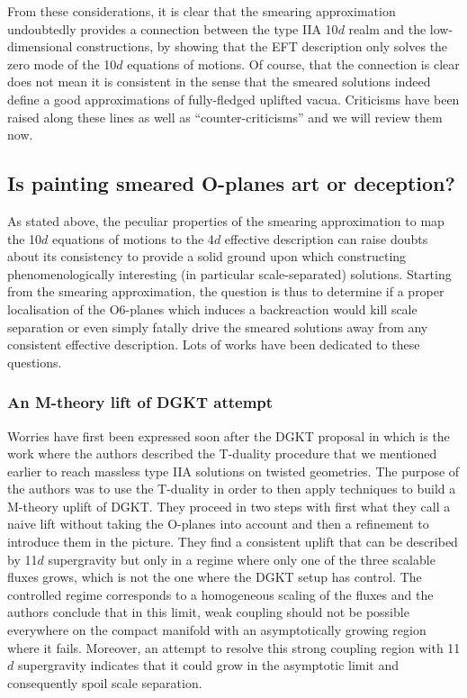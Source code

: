 \documentclass[11pt, a4paper]{article}
\begin{document}
From these considerations, it is clear that the smearing approximation undoubtedly provides a connection between the type IIA 10$d$ realm and the low-dimensional constructions, by showing that the EFT description only solves the zero mode of the 10$d$ equations of motions. Of course, that the connection is clear does not mean it is consistent in the sense that the smeared solutions indeed define a good approximations of fully-fledged uplifted vacua. Criticisms have been raised along these lines as well as ``counter-criticisms'' and we will review them now.

\subsection{Is painting smeared O-planes art or deception?}
\label{sec:smearing?}

As stated above, the peculiar properties of the smearing approximation to map the 10$d$ equations of motions to the 4$d$ effective description can raise doubts about its consistency to provide a solid ground upon which constructing phenomenologically interesting (in particular scale-separated) solutions. Starting from the smearing approximation, the question is thus to determine if a proper localisation of the O6-planes which induces a backreaction would kill scale separation or even simply fatally drive the smeared solutions away from any consistent effective description. Lots of works have been dedicated to these questions.

\subsubsection{An M-theory lift of DGKT attempt}
\label{sec:Mlift}

Worries have first been expressed soon after the DGKT proposal in \cite{Banks:2006hg} which is the work where the authors described the T-duality procedure that we mentioned earlier to reach massless type IIA solutions on twisted geometries. The purpose of the authors was to use the T-duality in order to then apply techniques \cite{Haack:2001jz,Singh:2001gt,Singh:2002tf} to build a M-theory uplift of DGKT. They proceed in two steps with first what they call a naive lift without taking the O-planes into account and then a refinement to introduce them in the picture. They find a consistent uplift that can be described by 11$d$ supergravity but only in a regime where only one of the three scalable fluxes grows, which is not the one where the DGKT setup has control. The controlled regime corresponds to a homogeneous scaling of the fluxes and the authors conclude that in this limit, weak coupling should not be possible everywhere on the compact manifold with an asymptotically growing region where it fails. Moreover, an attempt to resolve this strong coupling region with 11$d$ supergravity indicates that it could grow in the asymptotic limit and consequently spoil scale separation. 
\end{document}
